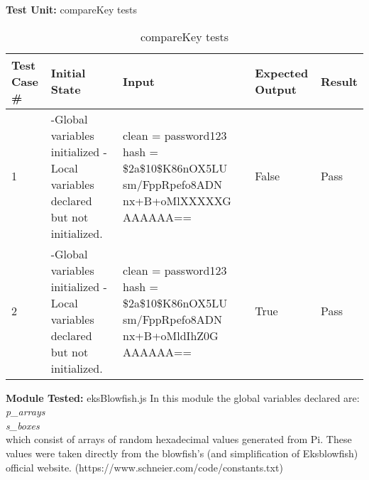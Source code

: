\documentclass[12pt]{article}
\begin{document}
  \break

  \textbf{Test Unit:} compareKey tests \newline
    \begin{table}[H]
    \centering
            \caption{compareKey tests}
              \label{tab:table5}
            \begin{tabular}{ | p{1cm} | p{5cm} | p{4cm} | p{3cm} | p{1.2cm} | }
            \hline
                \textbf{Test Case \#} & \textbf{Initial State} & \textbf{Input} & \textbf{Expected \newline Output} & \textbf{Result} \\
            \hline
              1 & -Global variables initialized \newline -Local variables declared but not initialized. & clean = password123 \newline hash = \newline \$2a\$10\$K86nOX5LU \newline sm/FppRpefo8ADN \newline nx+B+oMlXXXXXG \newline AAAAAA== & False & Pass \\
            \hline
              2 & -Global variables initialized \newline -Local variables declared but not initialized. & clean = password123 \newline hash = \newline \$2a\$10\$K86nOX5LU \newline sm/FppRpefo8ADN \newline nx+B+oMldIhZ0G \newline AAAAAA== & True & Pass \\
            \hline
            \end{tabular}
        \end{table}



    \break

    \noindent \textbf{Module Tested:} eksBlowfish.js \newline
    In this module the global variables declared are: \\
     \textit{p\_arrays} \\
     \textit{s\_boxes} \\
    \noindent which consist of arrays of random hexadecimal values generated from Pi. These values were taken directly from the blowfish’s (and simplification of Eksblowfish) official website. \newline (https://www.schneier.com/code/constants.txt) \break
\end{document}
